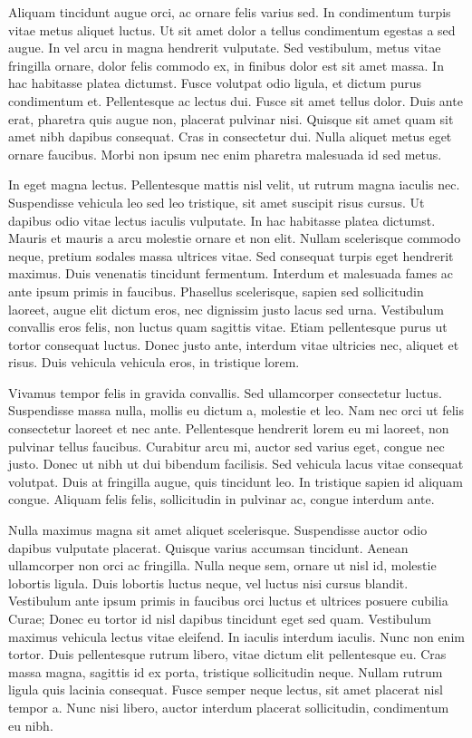 Aliquam tincidunt augue orci, ac ornare felis varius sed. In condimentum turpis vitae metus aliquet luctus. Ut sit amet dolor a tellus condimentum egestas a sed augue. In vel arcu in magna hendrerit vulputate. Sed vestibulum, metus vitae fringilla ornare, dolor felis commodo ex, in finibus dolor est sit amet massa. In hac habitasse platea dictumst. Fusce volutpat odio ligula, et dictum purus condimentum et. Pellentesque ac lectus dui. Fusce sit amet tellus dolor. Duis ante erat, pharetra quis augue non, placerat pulvinar nisi. Quisque sit amet quam sit amet nibh dapibus consequat. Cras in consectetur dui. Nulla aliquet metus eget ornare faucibus. Morbi non ipsum nec enim pharetra malesuada id sed metus.

In eget magna lectus. Pellentesque mattis nisl velit, ut rutrum magna iaculis nec. Suspendisse vehicula leo sed leo tristique, sit amet suscipit risus cursus. Ut dapibus odio vitae lectus iaculis vulputate. In hac habitasse platea dictumst. Mauris et mauris a arcu molestie ornare et non elit. Nullam scelerisque commodo neque, pretium sodales massa ultrices vitae. Sed consequat turpis eget hendrerit maximus. Duis venenatis tincidunt fermentum. Interdum et malesuada fames ac ante ipsum primis in faucibus. Phasellus scelerisque, sapien sed sollicitudin laoreet, augue elit dictum eros, nec dignissim justo lacus sed urna. Vestibulum convallis eros felis, non luctus quam sagittis vitae. Etiam pellentesque purus ut tortor consequat luctus. Donec justo ante, interdum vitae ultricies nec, aliquet et risus. Duis vehicula vehicula eros, in tristique lorem.

Vivamus tempor felis in gravida convallis. Sed ullamcorper consectetur luctus. Suspendisse massa nulla, mollis eu dictum a, molestie et leo. Nam nec orci ut felis consectetur laoreet et nec ante. Pellentesque hendrerit lorem eu mi laoreet, non pulvinar tellus faucibus. Curabitur arcu mi, auctor sed varius eget, congue nec justo. Donec ut nibh ut dui bibendum facilisis. Sed vehicula lacus vitae consequat volutpat. Duis at fringilla augue, quis tincidunt leo. In tristique sapien id aliquam congue. Aliquam felis felis, sollicitudin in pulvinar ac, congue interdum ante.

Nulla maximus magna sit amet aliquet scelerisque. Suspendisse auctor odio dapibus vulputate placerat. Quisque varius accumsan tincidunt. Aenean ullamcorper non orci ac fringilla. Nulla neque sem, ornare ut nisl id, molestie lobortis ligula. Duis lobortis luctus neque, vel luctus nisi cursus blandit. Vestibulum ante ipsum primis in faucibus orci luctus et ultrices posuere cubilia Curae; Donec eu tortor id nisl dapibus tincidunt eget sed quam. Vestibulum maximus vehicula lectus vitae eleifend. In iaculis interdum iaculis. Nunc non enim tortor. Duis pellentesque rutrum libero, vitae dictum elit pellentesque eu. Cras massa magna, sagittis id ex porta, tristique sollicitudin neque. Nullam rutrum ligula quis lacinia consequat. Fusce semper neque lectus, sit amet placerat nisl tempor a. Nunc nisi libero, auctor interdum placerat sollicitudin, condimentum eu nibh.

